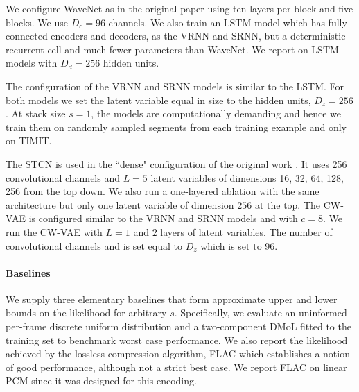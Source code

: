 {We configure WaveNet as in the original paper using ten layers per block and five blocks. We use $D_c=96$ channels. 
We also train an LSTM model \cite{hochreiter_long_1997} which has fully connected encoders and decoders, as the VRNN and SRNN, but a deterministic recurrent cell and much fewer parameters than WaveNet. We report on LSTM models with $D_d=256$ hidden units. 

The configuration of the VRNN and SRNN models is similar to the LSTM. For both models we set the latent variable equal in size to the hidden units, $D_z=256$. At stack size $s=1$, the models are computationally demanding and hence we train them on randomly sampled segments from each training example and only on TIMIT.

The STCN is used in the ``dense" configuration of the original work \cite{aksan_stcn_2019}. It uses 256 convolutional channels and $L=5$ latent variables of dimensions 16, 32, 64, 128, 256 from the top down. We also run a one-layered ablation with the same architecture but only one latent variable of dimension $256$ at the top. 
The CW-VAE is configured similar to the VRNN and SRNN models and with $c=8$. 
We run the CW-VAE with $L=1$ and $2$ layers of latent variables. 
The number of convolutional channels and is set equal to $D_z$ which is set to 96.
%
\paragraph{Baselines} We supply three elementary baselines that form approximate upper and lower bounds on the likelihood for arbitrary $s$. Specifically, we evaluate an uninformed per-frame discrete uniform distribution and a two-component DMoL fitted to the training set to benchmark worst case performance. 
We also report the likelihood achieved by the lossless compression algorithm, FLAC \cite{coalson_free_2019} which establishes a notion of good performance, although not a strict best case. We report FLAC on linear PCM since it was designed for this encoding.

}
